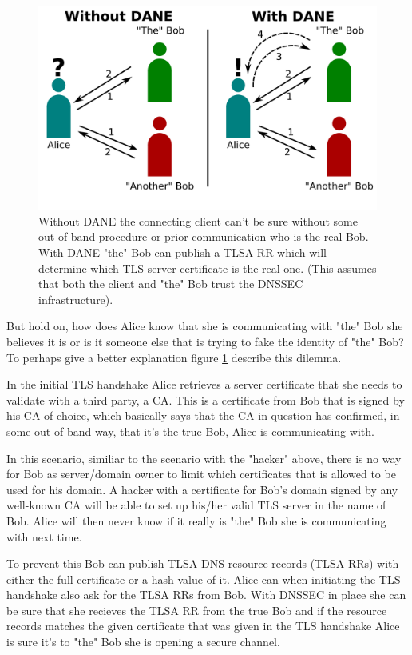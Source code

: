 \begin{figure}[ht]
\begin{center}
\includegraphics[scale=1]{Figures/daneWithAndWithoutDane.png}
\end{center}
\caption{Without DANE the connecting client can't be sure without some out-of-band procedure or prior communication who is the real Bob. With DANE "the" Bob can publish a TLSA RR which will determine which TLS server certificate is the real one. (This assumes that both the client and "the" Bob trust the DNSSEC infrastructure).\label{ch3:daneWithAndWithoutDane}}
\end{figure}


But hold on, how does Alice know that she is communicating with "the" Bob she believes it is or is it someone else that is trying to fake the identity of "the" Bob?
To perhaps give a better explanation figure \ref{ch3:daneWithAndWithoutDane} describe this dilemma.

In the initial TLS handshake Alice retrieves a server certificate that she needs to validate with a third party, a CA.
This is a certificate from Bob that is signed by his CA of choice, which basically says that the CA in question has confirmed, in some out-of-band way, that it's the true Bob, Alice is communicating with.

In this scenario, similiar to the scenario with the "hacker" above, there is no way for Bob as server/domain owner to limit which certificates that is allowed to be used for his domain.
A hacker with a certificate for Bob's domain signed by any well-known CA will be able to set up his/her valid TLS server in the name of Bob.
Alice will then never know if it really is "the" Bob she is communicating with next time.

To prevent this Bob can publish TLSA DNS resource records (TLSA RRs)\cite[ch. 2]{rfc:draft-dane} with either the full certificate or a hash value of it.
Alice can when initiating the TLS handshake also ask for the TLSA RRs from Bob.
With DNSSEC in place she can be sure that she recieves the TLSA RR from the true Bob and if the resource records matches the given certificate that was given in the TLS handshake Alice is sure it's to "the" Bob she is opening a secure channel.

